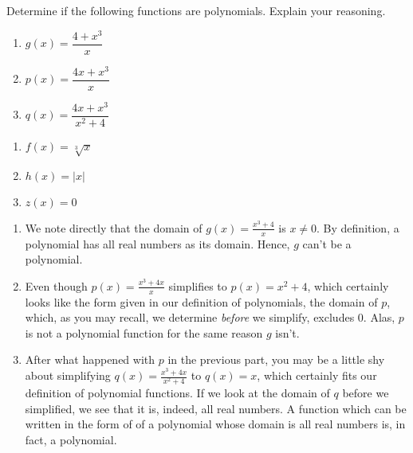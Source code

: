 \documentclass{ximera}
\begin{document}
\begin{example}
Determine if the following functions are polynomials.  Explain your reasoning.

\begin{multicols}{3}
\begin{enumerate}

\item  $g(x) = \dfrac{4+x^3}{x}$
\item  $p(x) = \dfrac{4x+x^3}{x}$
\item  $q(x) = \dfrac{4x+x^3}{x^2+4}$

\end{enumerate}
\end{multicols}

\begin{multicols}{3}
\begin{enumerate}

\item  $f(x) =\sqrt[3]{x}$
\item  $h(x) = |x|$
\item  $z(x) = 0$

\end{enumerate}
\end{multicols}

\begin{explanation}

\begin{enumerate}

\item  We note directly that the domain of $g(x) = \frac{x^3+4}{x}$ is $x \neq 0$.  By definition, a polynomial has all real numbers as its domain.  Hence, $g$ can't be a polynomial.

\item  Even though $p(x) = \frac{x^3+4x}{x}$ simplifies to $p(x) = x^2+4$, which certainly looks like the form given in our definition of polynomials, the domain of $p$, which, as you may recall, we determine \emph{before} we simplify, excludes $0$.  Alas, $p$ is not a polynomial function for the same reason $g$ isn't.

\item  After what happened with $p$ in the previous part, you may be a little shy about simplifying $q(x) = \frac{x^3+4x}{x^2+4}$ to $q(x) = x$, which certainly fits our definition of polynomial functions.  If we look at the domain of $q$ before we simplified, we see that it is, indeed, all real numbers.  A function which can be written in the form of of a polynomial whose domain is all real numbers is, in fact, a polynomial.  


\end{enumerate}
\end{explanation}
\end{example}
\end{document}
